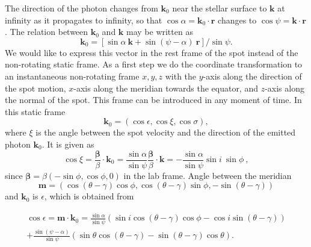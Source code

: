 \documentclass{wihuri}
\def\be{\begin{equation}}
\def\ee{\end{equation}}
\newcommand{\bmath}[1]{\boldsymbol{#1}}
\begin{document}
The direction of the photon changes from $\bmath{k}_0$ near the stellar surface to $\bmath{k}$ at infinity as it propagates to infinity, so that $\cos\alpha=\bmath{k}_0\cdot\bmath{r}$
changes to $\cos\psi=\bmath{k}\cdot\bmath{r}$.
The relation between $\bmath{k}_0$ and $\bmath{k}$ may be written as
\be\label{eq:k02}
\bmath{k}_0=[ \sin\alpha\ \bmath{k} +\sin(\psi-\alpha)\ \bmath{r}]/\sin\psi.
\ee
We would like to express this vector in the rest frame of the spot instead of the non-rotating static frame. As a first step we do the coordinate transformation to an instantaneous non-rotating frame $x,y,z$ with the $y$-axis along the direction of the spot motion, $x$-axis along the meridian towards the equator, and $z$-axis along the normal of the spot. This frame can be introduced in any moment of time. In this static frame
\be 
\bmath{k}_0=
\left( 
\cos \epsilon,
\cos\xi, 
\cos\sigma
\right) ,
\ee 
where $\xi$ is the angle  between the spot velocity and the direction of the emitted photon $\bmath{k}_0$. It is given as   
\be \label{eq:cosxi22}
\cos\xi=\frac{\bmath{\beta}}{\beta} \cdot \bmath{k}_0
=\frac{\sin\alpha}{\sin\psi} \frac{\bmath{\beta}}{\beta} \cdot \bmath{k}=
- \frac{\sin\alpha}{\sin\psi}\sin i\ \sin\phi\ ,
\ee
since $\bmath{\beta} = \beta(-\sin\phi,\cos\phi,0)$ in the lab frame. Angle between the meridian %
\be
 \bmath{m} = (\cos(\theta - \gamma)\cos \phi ,\cos (\theta -\gamma)\sin \phi, -\sin (\theta -\gamma))
\ee
and $\bmath{k}_0$ is $\epsilon$, which is obtained from 

\be \label{eq:kx-comp}
\begin{split}
\cos\epsilon= \bmath{m} \cdot \bmath{k}_0
=\frac{\sin\alpha}{\sin\psi} (\sin i \cos(\theta -\gamma)\cos \phi -\cos i \sin (\theta -\gamma)) \\ + \frac{\sin (\psi - \alpha)}{\sin \psi}(\sin \theta \cos (\theta -\gamma)-\sin (\theta -\gamma)\cos \theta).
\end{split}
\ee
\end{document}
